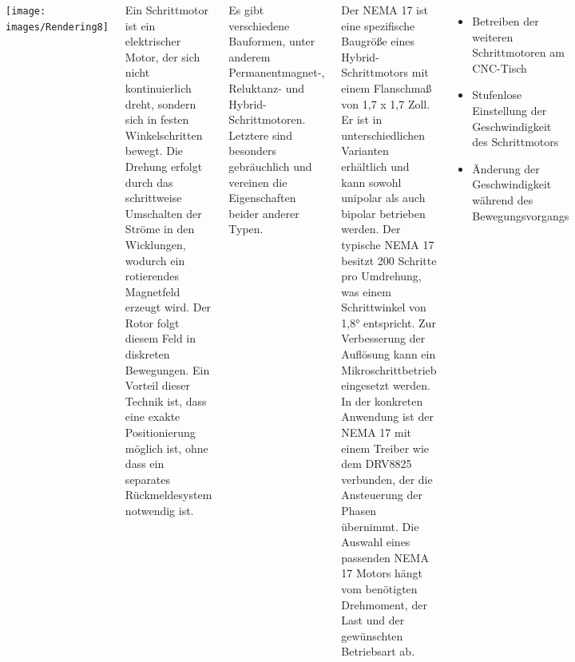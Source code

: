 \documentclass[25pt,a0paper, portrait]{tikzposter}
\begin{document}
\begin{columns} 
	
	{
		{
			\begin{tikzfigure}
				\texttt{[image: images/Rendering8]}
			\end{tikzfigure}	
		}
	}
	
	
	{
		{
			Ein Schrittmotor ist ein elektrischer Motor, der sich nicht kontinuierlich dreht, sondern sich in festen Winkelschritten bewegt. Die Drehung erfolgt durch das schrittweise Umschalten der Ströme in den Wicklungen, wodurch ein rotierendes Magnetfeld erzeugt wird. Der Rotor folgt diesem Feld in diskreten Bewegungen. Ein Vorteil dieser Technik ist, dass eine exakte Positionierung möglich ist, ohne dass ein separates Rückmeldesystem notwendig ist.
			
			Es gibt verschiedene Bauformen, unter anderem Permanentmagnet-, Reluktanz- und Hybrid-Schrittmotoren. Letztere sind besonders gebräuchlich und vereinen die Eigenschaften beider anderer Typen.
			
			Der NEMA 17 ist eine spezifische Baugröße eines Hybrid-Schrittmotors mit einem Flanschmaß von 1,7 x 1,7 Zoll. Er ist in unterschiedlichen Varianten erhältlich und kann sowohl unipolar als auch bipolar betrieben werden. Der typische NEMA 17 besitzt 200 Schritte pro Umdrehung, was einem Schrittwinkel von 1,8° entspricht. Zur Verbesserung der Auflösung kann ein Mikroschrittbetrieb eingesetzt werden. In der konkreten Anwendung ist der NEMA 17 mit einem Treiber wie dem DRV8825 verbunden, der die Ansteuerung der Phasen übernimmt. Die Auswahl eines passenden NEMA 17 Motors hängt vom benötigten Drehmoment, der Last und der gewünschten Betriebsart ab.
		}
		{
			\begin{itemize}
				\item Betreiben der weiteren Schrittmotoren am CNC-Tisch
				\item Stufenlose Einstellung der Geschwindigkeit des Schrittmotors
				\item Änderung der Geschwindigkeit während des Bewegungsvorgangs
			\end{itemize}
			
			
		}
	}
\end{columns}
\end{document}
